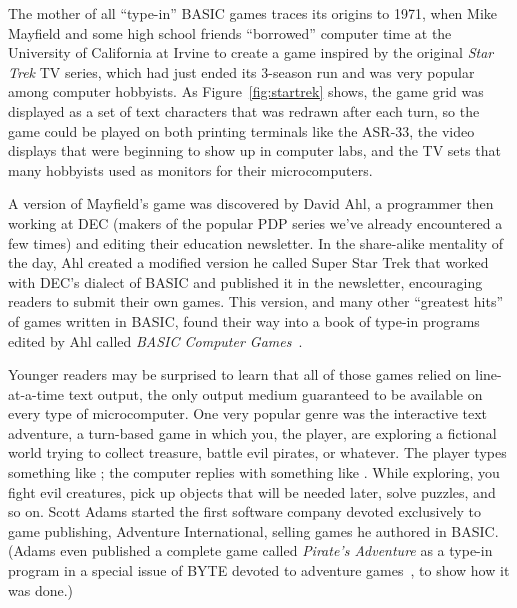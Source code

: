 The mother of all ``type-in'' BASIC games
traces its origins to 1971,
when Mike Mayfield and some high school friends ``borrowed'' computer time 
at the University of California at Irvine to create a game inspired by the
original \emph{Star Trek} TV series, which had just ended its 3-season
run and was very popular among computer hobbyists.
As Figure~\ref{fig:startrek} shows, the game grid was displayed as a
set of text characters that was redrawn 
after each turn, so the game could be played on both printing
terminals like the ASR-33, the video displays that were beginning
to show up in computer labs, and the TV sets that many hobbyists used
as monitors for their microcomputers.

A version of Mayfield's game
was discovered by David Ahl, a programmer
then working at DEC (makers of the popular PDP series we've already
encountered a few times) and editing their education newsletter.
In the share-alike mentality of the day, Ahl created a modified
version he called Super Star Trek that worked with DEC's dialect of
BASIC and published it in the
newsletter, encouraging readers to submit their own games.
This version, and many other ``greatest hits'' of games written in
BASIC, found their way into a book of type-in programs edited by Ahl called \emph{BASIC
Computer Games}~\cite{basic_computer_games}.


Younger readers may be surprised to learn that all of those games
relied on line-at-a-time text output, the only
output medium guaranteed to be available on every type of
microcomputer.
One very popular genre was the interactive text adventure,
a turn-based game in which you, the
player, are exploring a fictional world trying to collect treasure,
battle evil pirates, or whatever.
The player types something like ; the computer replies
with something like .  While
exploring, you fight evil creatures, pick up objects that will be
needed later, solve puzzles, and so on.
Scott Adams
started the first software company devoted exclusively to game
publishing, Adventure International, selling games he authored in BASIC.
(Adams even published a complete game called \emph{Pirate's Adventure}
as a type-in program in a special issue of BYTE devoted to adventure
games~\cite{byte80:adventure}, to show how it was done.)

